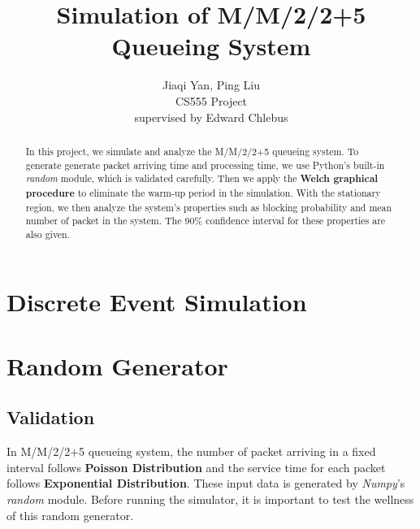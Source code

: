 \documentclass[12pt]{article}  %
\title{Simulation of M/M/2/2+5 Queueing System}
\author{Jiaqi Yan, Ping Liu\\
CS555 Project\\
supervised by
Edward Chlebus}
\theoremstyle{definition}
\theoremstyle{remark}
\begin{document}
\maketitle

\begin{abstract}
In this project, we simulate and analyze the M/M/2/2+5 queueing system. 
To generate generate packet arriving time and processing time, we use Python's built-in \textit{random} module, which is validated carefully.
Then we apply the \textbf{Welch graphical procedure} to eliminate the warm-up period in the simulation.
With the stationary region, we then analyze the system's properties such as blocking probability and mean number of packet in the system.
The 90\% confidence interval for these properties are also given.
\end{abstract}

\newpage
\tableofcontents

\newpage
\section{Discrete Event Simulation}\label{sec:des}


\section{Random Generator}
\subsection{Validation}
In M/M/2/2+5 queueing system, the number of packet arriving in a fixed interval follows \textbf{Poisson Distribution} and the service time for each packet follows \textbf{Exponential Distribution}.
These input data is generated by \textit{Numpy}'s \textit{random} module. Before running the simulator, it is important to test the wellness of this random generator.
\end{document}
